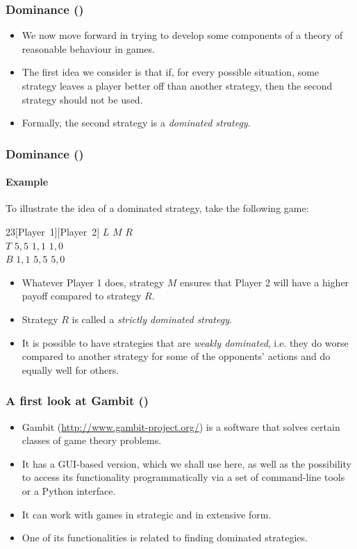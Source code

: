 \documentclass[10pt]{beamer}
\theoremstyle{definition}
\begin{document}
\setcounter{slidenum}{1}
\begin{frame}[fragile]
\frametitle{Dominance ()}
\begin{itemize}\itemsep1em
\item We now move forward in trying to develop some components of a theory of reasonable behaviour in games.
\item The first idea we consider is that if, for every possible situation, some strategy leaves a player better off than another strategy, then the second strategy should not be used.
\item Formally, the second strategy is a \emph{dominated strategy}.
\end{itemize}
\end{frame}



\begin{frame}[fragile]
\frametitle{Dominance ()}
\framesubtitle{Example }
To  illustrate the idea of a dominated strategy, take the following game:
\begin{center}
\begin{game}{2}{3}[Player~1][Player~2]
 \> $ L $ \> $ M $ \> $ R $ \\
$ T $ \> $ 5,5 $ \> $ 1,1 $ \> $ 1,0 $ \\
$ B $ \> $ 1,1 $ \> $ 5,5 $ \> $ 5,0 $
\end{game}
\end{center}

\begin{itemize}\itemsep1em
\item Whatever Player 1 does, strategy $ M $ ensures that Player 2 will have a higher payoff compared to strategy $ R $.
\item Strategy $ R $ is called a \emph{strictly dominated strategy}.
\item It is possible to have strategies that are \emph{weakly dominated}, i.e. they do worse compared to another strategy for some of the opponents' actions and do equally well for others.
\end{itemize}
\end{frame}



\setcounter{slidenum}{1}
\begin{frame}[fragile]
\frametitle{A first look at Gambit ()}
\begin{itemize}\itemsep1em
\item Gambit (\url{http://www.gambit-project.org/}) is a software that solves certain classes of game theory problems.
\item It has a GUI-based version, which we shall use here, as well as the possibility to access its functionality programmatically via a set of command-line tools or a Python interface.
\item It can work with games in strategic and in extensive form.
\item One of its functionalities is related to finding dominated strategies.
\end{itemize}
\end{frame}
\end{document}
